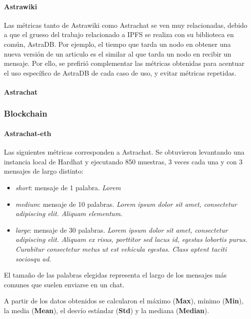 \paragraph{Astrawiki}

Las métricas tanto de Astrawiki como Astrachat se ven muy relacionadas, debido a que el grueso del trabajo relacionado a IPFS se realiza con su biblioteca en común, AstraDB. Por ejemplo, el tiempo que tarda un nodo en obtener una nueva versión de un articulo es el similar al que tarda un nodo en recibir un mensaje. Por ello, se prefirió complementar las métricas obtenidas para acentuar el uso específico de AstraDB de cada caso de uso, y evitar métricas repetidas. 

\paragraph{Astrachat}

\subsubsection{Blockchain}

\paragraph{Astrachat-eth}

Las siguientes métricas corresponden a Astrachat. Se obtuvieron levantando una instancia local de Hardhat \cite{hardhat} y ejecutando 850 muestras, 3 veces cada una y con 3 mensajes de largo distinto:

\begin{itemize}
    \item \textit{short}: mensaje de 1 palabra. \textit{Lorem}
    \item \textit{medium}: mensaje de 10 palabras. \textit{Lorem ipsum dolor sit amet, consectetur adipiscing elit. Aliquam elementum.}
    \item \textit{large}: mensaje de 30 palabras. \textit{Lorem ipsum dolor sit amet, consectetur adipiscing elit. Aliquam ex risus, porttitor sed lacus id, egestas lobortis purus. Curabitur consectetur metus ut est vehicula egestas. Class aptent taciti sociosqu ad.}
\end{itemize}

El tamaño de las palabras elegidas representa el largo de los mensajes más comunes que suelen enviarse en un chat.

A partir de los datos obtenidos se calcularon el máximo (\textbf{Max}), mínimo (\textbf{Min}), la media (\textbf{Mean}), el desvío estándar (\textbf{Std}) y la mediana (\textbf{Median}).

